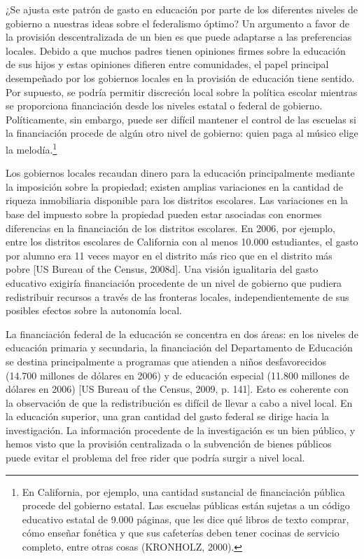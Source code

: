 \documentclass[10pt,a4paper]{article}
\begin{document}
¿Se ajusta este patrón de gasto en educación por parte de los diferentes niveles de gobierno a nuestras ideas sobre el federalismo óptimo? Un argumento a favor de la provisión descentralizada de un bien es que puede adaptarse a las preferencias locales. Debido a que muchos padres tienen opiniones firmes sobre la educación de sus hijos y estas opiniones difieren entre comunidades, el papel principal desempeñado por los gobiernos locales en la provisión de educación tiene sentido. Por supuesto, se podría permitir discreción local sobre la política escolar mientras se proporciona financiación desde los niveles estatal o federal de gobierno. Políticamente, sin embargo, puede ser difícil mantener el control de las escuelas si la financiación procede de algún otro nivel de gobierno: quien paga al músico elige la melodía.\footnote{%
    En California, por ejemplo, una cantidad sustancial de financiación pública procede del gobierno estatal. Las escuelas públicas están sujetas a un código educativo estatal de 9.000 páginas, que les dice qué libros de texto comprar, cómo enseñar fonética y que sus cafeterías deben tener cocinas de servicio completo, entre otras cosas (KRONHOLZ, 2000).
}

Los gobiernos locales recaudan dinero para la educación principalmente mediante la imposición sobre la propiedad; existen amplias variaciones en la cantidad de riqueza inmobiliaria disponible para los distritos escolares. Las variaciones en la base del impuesto sobre la propiedad pueden estar asociadas con enormes diferencias en la financiación de los distritos escolares. En 2006, por ejemplo, entre los distritos escolares de California con al menos 10.000 estudiantes, el gasto por alumno era 11 veces mayor en el distrito más rico que en el distrito más pobre [US Bureau of the Census, 2008d]. Una visión igualitaria del gasto educativo exigiría financiación procedente de un nivel de gobierno que pudiera redistribuir recursos a través de las fronteras locales, independientemente de sus posibles efectos sobre la autonomía local. 

La financiación federal de la educación se concentra en dos áreas: en los niveles de educación primaria y secundaria, la financiación del Departamento de Educación se destina principalmente a programas que atienden a niños desfavorecidos (14.700 millones de dólares en 2006) y de educación especial (11.800 millones de dólares en 2006) [US Bureau of the Census, 2009, p. 141]. Esto es coherente con la observación de que la redistribución es difícil de llevar a cabo a nivel local. En la educación superior, una gran cantidad del gasto federal se dirige hacia la investigación. La información procedente de la investigación es un bien público, y hemos visto que la provisión centralizada o la subvención de bienes públicos puede evitar el problema del free rider que podría surgir a nivel local.
\end{document}

